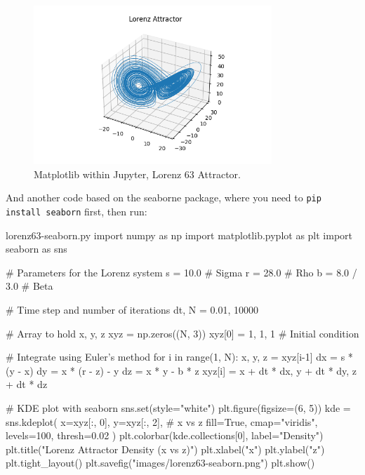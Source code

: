 \begin{center}
\begin{figure}[ht]
   \centerline{\includegraphics[width=0.8\textwidth]{images/lorenz63.png}}
	 \caption{Matplotlib within Jupyter, Lorenz 63 Attractor.}
\end{figure}
\end{center}%

And another code based on the seaborne package, where you need to \texttt{pip install seaborn} first, then run: 

\begin{codeonly}{lorenz63-seaborn.py}
import numpy as np
import matplotlib.pyplot as plt
import seaborn as sns

# Parameters for the Lorenz system
s = 10.0   # Sigma
r = 28.0   # Rho
b = 8.0 / 3.0  # Beta

# Time step and number of iterations
dt, N = 0.01, 10000

# Array to hold x, y, z
xyz = np.zeros((N, 3))
xyz[0] = 1, 1, 1  # Initial condition

# Integrate using Euler's method
for i in range(1, N):
    x, y, z = xyz[i-1]
    dx = s * (y - x)
    dy = x * (r - z) - y
    dz = x * y - b * z
    xyz[i] = x + dt * dx, y + dt * dy, z + dt * dz

# KDE plot with seaborn
sns.set(style="white")
plt.figure(figsize=(6, 5))
kde = sns.kdeplot(
    x=xyz[:, 0], y=xyz[:, 2],  # x vs z
    fill=True, cmap="viridis", levels=100, thresh=0.02
)
plt.colorbar(kde.collections[0], label="Density")
plt.title("Lorenz Attractor Density (x vs z)")
plt.xlabel("x")
plt.ylabel("z")
plt.tight_layout()
plt.savefig("images/lorenz63-seaborn.png")
plt.show()
\end{codeonly}

